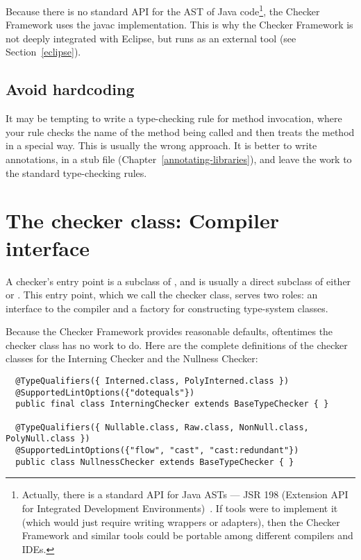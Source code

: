 Because there is no standard API for the AST of Java code\footnote{Actually,
there is a standard API for Java ASTs --- JSR 198 (Extension API for
Integrated Development Environments)~\cite{JSR198}.  If tools were to
implement it
(which would just require writing wrappers or adapters), then the Checker
Framework and similar tools could be portable among different compilers and
IDEs.}, the Checker
Framework uses the javac implementation.  This is why the Checker Framework
is not deeply integrated with Eclipse, but runs as an external tool (see
Section~\ref{eclipse}).


\subsection{Avoid hardcoding\label{avoid-hardcoding}}

It may be tempting to write a type-checking rule for method invocation,
where your rule checks the name of the method being called and then treats
the method in a special way.  This is usually the wrong approach.  It
is better to write annotations, in a stub file
(Chapter~\ref{annotating-libraries}), and leave the work to the standard
type-checking rules.


\section{The checker class:  Compiler interface\label{writing-compiler-interface}}

A checker's entry point is a subclass of
, and is usually a direct subclass
of either  or
.
This entry
point, which we call the checker class, serves two
roles:  an interface to the compiler and a factory for constructing
type-system classes.

Because the Checker Framework provides reasonable defaults, oftentimes the
checker class has no work to do.  Here are the complete definitions of the
checker classes for the Interning Checker and the Nullness Checker:

\begin{Verbatim}
  @TypeQualifiers({ Interned.class, PolyInterned.class })
  @SupportedLintOptions({"dotequals"})
  public final class InterningChecker extends BaseTypeChecker { }

  @TypeQualifiers({ Nullable.class, Raw.class, NonNull.class, PolyNull.class })
  @SupportedLintOptions({"flow", "cast", "cast:redundant"})
  public class NullnessChecker extends BaseTypeChecker { }
\end{Verbatim}


